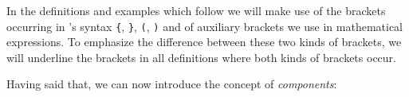 % 
In the definitions and examples which follow we will make use of the brackets occurring in \nthree's syntax \texttt{\{}, \texttt{\}}, \texttt{(}, \texttt{)} and of auxiliary 
brackets we use in mathematical expressions.
 To emphasize the difference between these two kinds of brackets,
 we will underline the \nthree brackets in all definitions where both kinds of brackets occur.
% 
% 

Having said that, we can now introduce the concept of \emph{components}:




